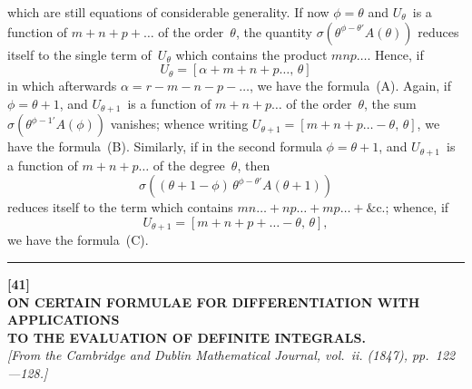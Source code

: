\documentclass[11pt,a4paper]{book}
\begin{document}
\newpage
which are still equations of considerable generality. If now $\phi = \theta$ and $U_\theta$~is a function of $m+n+p+\ldots$ of the order~$\theta$, the quantity $\sigma\left(\theta^{\phi-\theta'} A(\theta)\right)$ reduces itself to the single term of~$U_\theta$ which contains the product $mnp\ldots$. Hence, if
\[
U_\theta = [\alpha + m+n+p\ldots,\,\theta]
\]
in which afterwards $\alpha = r-m-n-p-\ldots$, we have the formula~(A). Again, if $\phi = \theta+1$, and $U_{\theta+1}$~is a function of $m+n+p\ldots$ of the order~$\theta$, the sum $\sigma\left(\theta^{\phi-1'} A(\phi)\right)$ vanishes; whence writing $U_{\theta+1} = [m+n+p\ldots - \theta,\,\theta]$, we have the formula~(B). Similarly, if in the second formula $\phi = \theta+1$, and $U_{\theta+1}$~is a function of $m+n+p\ldots$ of the degree~$\theta$, then
\[
\sigma\left((\theta+1-\phi)\,\theta^{\phi-\theta'} A(\theta+1)\right)
\]
reduces itself to the term which contains $mn\ldots + np\ldots + mp\ldots + \text{\&c.}$; whence, if
\[
U_{\theta+1} = [m+n+p+\ldots - \theta,\,\theta],
\]
we have the formula~(C).

\vspace{20pt}
\begin{center}
\rule{0.5\textwidth}{0.4pt}
\end{center}


\newpage
\begin{center}
\textbf{[41]}\\[4pt]
\textbf{\large ON CERTAIN FORMULAE FOR DIFFERENTIATION WITH APPLICATIONS\\TO THE EVALUATION OF DEFINITE INTEGRALS.}\\[4pt]
\textit{[From the Cambridge and Dublin Mathematical Journal, vol.~ii. (1847), pp.~122---128.]}
\end{center}

\vspace{6pt}
\end{document}
